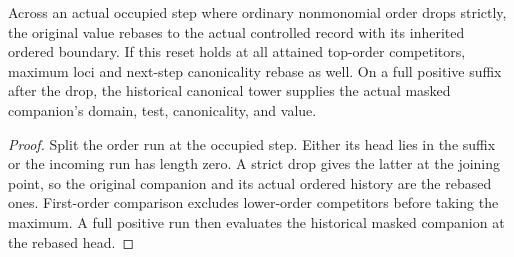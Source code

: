 \begin{theorem}
\label{hir:g8-occupied-order-reset}
\leanok
Across an actual occupied step where ordinary nonmonomial order
drops strictly, the original value rebases to the actual controlled
record with its inherited ordered boundary. If this reset holds at
all attained top-order competitors, maximum loci and next-step
canonicality rebase as well. On a full positive suffix after the
drop, the historical canonical tower supplies the actual masked
companion's domain, test, canonicality, and value.
\end{theorem}
\begin{proof}
Split the order run at the occupied step. Either its head lies
in the suffix or the incoming run has length zero. A strict
drop gives the latter at the joining point, so the original
companion and its actual ordered history are the rebased ones.
First-order comparison excludes lower-order competitors before
taking the maximum. A full positive run then evaluates the
historical masked companion at the rebased head.
\end{proof}

